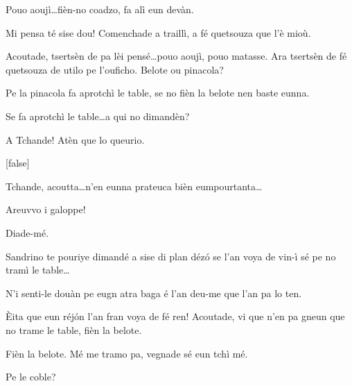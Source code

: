\begin{drama}
\Richardspeaks Pouo aoujì\ldots fièn-no coadzo, fa alì eun devàn.

\Tuenospeaks Mi pensa té sise dou! Comenchade a traillì, a fé quetsouza que l'è mioù.


\Richardspeaks  Acoutade, tsertsèn de pa lèi pensé\ldots pouo aoujì, pouo matasse. Ara tsertsèn de fé quetsouza de utilo pe l'ouficho.  Belote ou pinacola?


\Gerominespeaks Pe la pinacola fa aprotchì le table, se no fièn la belote nen baste eunna.


\Saventaspeaks Se fa aprotchì le table\ldots a qui no dimandèn? 

\Tuenospeaks A Tchande! Atèn que lo queurio.


[false]\label{tel}


\Tuenospeaks Tchande, acoutta\ldots n'en eunna prateuca bièn eumpourtanta\ldots

\Sandrinospeaks Areuvvo i galoppe!


\Sandrinospeaks Diade-mé.

\Gerominespeaks Sandrino te pouriye dimandé a sise di plan déz\'o se l'an voya de vin-ì sé pe no tramì le table\ldots

\Sandrinospeaks N'i senti-le douàn pe eugn atra baga é l'an deu-me que l'an pa lo ten.


\Richardspeaks \`Eita que eun réj\'on l'an fran voya de fé ren! Acoutade, vi que n'en pa gneun que no trame le table, fièn la belote.

\Tuenospeaks Fièn la belote. Mé me tramo pa, vegnade sé eun tchì mé.


\Gerominespeaks Pe le coble?


\end{drama}
